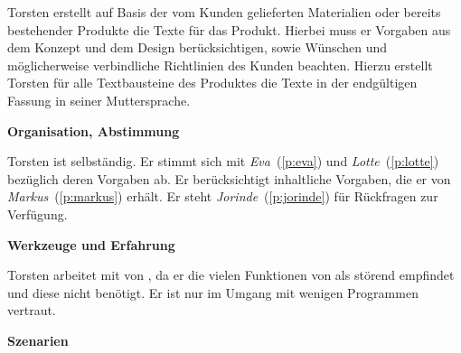 \begin{multicols}{2}

\begin{center}
\end{center}


Torsten erstellt auf Basis der vom Kunden gelieferten Materialien oder bereits bestehender Produkte die Texte für das Produkt. Hierbei muss er Vorgaben aus dem Konzept und dem Design berücksichtigen, sowie Wünschen und möglicherweise verbindliche Richtlinien des Kunden beachten. Hierzu erstellt Torsten für alle Textbausteine des Produktes die Texte in der endgültigen Fassung in seiner Muttersprache.

\textbf{Organisation, Abstimmung}

Torsten ist selbständig. Er stimmt sich mit \emph{Eva}~(\ref{p:eva}) und \emph{Lotte}~(\ref{p:lotte}) bezüglich deren Vorgaben ab. Er berücksichtigt inhaltliche Vorgaben, die er von \emph{Markus}~(\ref{p:markus}) erhält. Er steht  \emph{Jorinde}~(\ref{p:jorinde}) für Rückfragen zur Verfügung.

\textbf{Werkzeuge und Erfahrung}

Torsten arbeitet mit  von , da er die vielen Funktionen von  als störend empfindet und diese nicht benötigt. Er ist nur im Umgang mit wenigen Programmen vertraut.

\columnbreak

\textbf{Szenarien}


\end{multicols}
